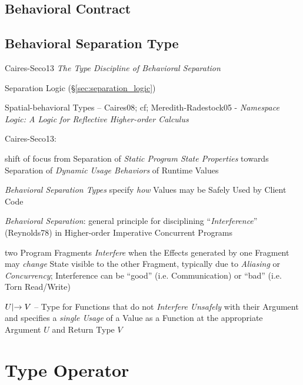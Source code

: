 \subsection{Behavioral Contract}\label{sec:behavioral_contract}

\subsection{Behavioral Separation Type}
\label{sec:behavioral_separation}

Caires-Seco13 \emph{The Type Discipline of Behavioral Separation}

Separation Logic (\S\ref{sec:separation_logic})

Spatial-behavioral Types -- Caires08; cf; Meredith-Radestock05 -
\emph{Namespace Logic: A Logic for Reflective Higher-order Calculus}

Caires-Seco13:

shift of focus from Separation of \emph{Static Program State
  Properties} towards Separation of \emph{Dynamic Usage Behaviors} of
Runtime Values

\emph{Behavioral Separation Types} specify \emph{how} Values may be
Safely Used by Client Code

\emph{Behavioral Separation}: general principle for disciplining
``\emph{Interference}'' (Reynolds78) in Higher-order Imperative
Concurrent Programs

two Program Fragments \emph{Interfere} when the Effects generated by
one Fragment may \emph{change} State visible to the other Fragment,
typically due to \emph{Aliasing} or \emph{Concurrency}; Interference
can be ``good'' (i.e. Communication) or ``bad'' (i.e. Torn Read/Write)

$U \mathrlap{|}\rightarrow V$ -- Type for Functions that do not \emph{Interfere
  Unsafely} with their Argument and specifies a \emph{single Usage} of
a Value as a Function at the appropriate Argument $U$ and Return Type
$V$



\section{Type Operator}\label{sec:type_operator}

